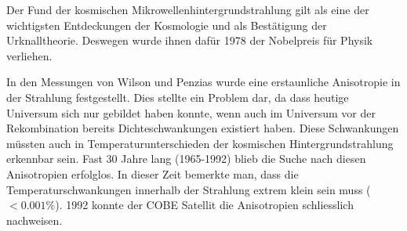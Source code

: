Der Fund der kosmischen Mikrowellenhintergrundstrahlung gilt als eine der wichtigsten Entdeckungen der Kosmologie und als 
Bestätigung der Urknalltheorie.
Deswegen wurde ihnen dafür 1978 der Nobelpreis für Physik verliehen.
\cite{cmb:dicke}

In den Messungen von Wilson und Penzias wurde eine erstaunliche Anisotropie in 
der Strahlung festgestellt.
Dies stellte ein Problem dar, da dass heutige Universum sich nur gebildet haben 
konnte, wenn auch im Universum vor der Rekombination bereits Dichteschwankungen 
existiert haben.
Diese Schwankungen müssten auch in Temperaturunterschieden der kosmischen 
Hintergrundstrahlung erkennbar sein.
Fast 30 Jahre lang (1965-1992) blieb die Suche nach diesen Anisotropien 
erfolglos.
In dieser Zeit bemerkte man, dass die Temperaturschwankungen innerhalb der 
Strahlung extrem klein sein muss ($< 0.001\%$).
1992 konnte der \ac{COBE} Satellit die Anisotropien schliesslich nachweisen.
\cite{cmb:m_schoenitzer}

